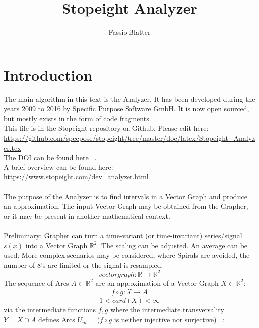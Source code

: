 \documentclass{report}
\begin{document}
\title{Stopeight Analyzer}
\author{Fassio Blatter}
\maketitle

\chapter{Introduction}
The main algorithm in this text is the Analyzer. It has been developed during the years 2009 to 2016 by Specific Purpose Software GmbH. It is now open sourced, but mostly exists in the form of code fragments.\\
This file is in the Stopeight repository on Github. Please edit here:\\
\href{https://github.com/specpose/stopeight/tree/master/doc/latex/Stopeight\_Analyzer.tex}{https://github.com/specpose/stopeight/tree/master/doc/latex/Stopeight\_Analyzer.tex}\\
The DOI can be found here ~\cite{Stopeight}.\\
A brief overview can be found here:\\
\href{https://www.stopeight.com/dev_analyzer.html}{https://www.stopeight.com/dev\_analyzer.html}\\\\
The purpose of the Analyzer is to find intervals in a Vector Graph and produce an approximation. The input Vector Graph may be obtained from the Grapher, or it may be present in another mathematical context.\\\\
Preliminary: Grapher can turn a time-variant (or time-invariant) series/signal $s(x)$ into a Vector Graph $\mathbb{R}^2$. The scaling can be adjusted. An average can be used. More complex scenarios may be considered, where Spirals are avoided, the number of 8's are limited or the signal is resampled.
\begin{equation}
vectorgraph: \mathbb{R} \rightarrow \mathbb{R}^2
\end{equation}
The sequence of Arcs $A \subset \mathbb{R}^2$ are an approximation of a Vector Graph $X \subset \mathbb{R}^2$:
\begin{align}
f \circ g: X \rightarrow A
\end{align}
\begin{equation*}
1 < card(X) < \infty
\end{equation*}
via the intermediate functions $f,g$ where the intermediate transversality $Y = X \cap A$ defines Arcs $U_{m}$. ~\cite[9.9]{Loring} ($f \circ g$ is neither injective nor surjective) ~\cite[2.1]{LauresSzymik}:
\end{document}
